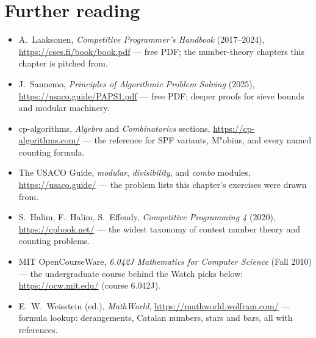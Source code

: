 \chapternotes

\section*{Further reading}
\begin{itemize}
\item A.~Laaksonen, \emph{Competitive Programmer's Handbook}
(2017--2024), \url{https://cses.fi/book/book.pdf} --- free PDF;
the number-theory chapters this chapter is pitched from.
\item J.~Sannemo, \emph{Principles of Algorithmic Problem Solving}
(2025), \url{https://usaco.guide/PAPS1.pdf} --- free PDF; deeper
proofs for sieve bounds and modular machinery.
\item cp-algorithms, \emph{Algebra} and \emph{Combinatorics}
sections, \url{https://cp-algorithms.com/} --- the reference for
SPF variants, M"obius, and every named counting formula.
\item The USACO Guide, \emph{modular}, \emph{divisibility}, and
\emph{combo} modules, \url{https://usaco.guide/} --- the problem
lists this chapter's exercises were drawn from.
\item S.~Halim, F.~Halim, S.~Effendy, \emph{Competitive
Programming 4} (2020), \url{https://cpbook.net/} --- the widest
taxonomy of contest number theory and counting problems.
\item MIT OpenCourseWare, \emph{6.042J Mathematics for Computer
Science} (Fall 2010) --- the undergraduate course behind the
Watch picks below: \url{https://ocw.mit.edu/} (course 6.042J).
\item E.~W.~Weisstein (ed.), \emph{MathWorld},
\url{https://mathworld.wolfram.com/} --- formula lookup:
derangements, Catalan numbers, stars and bars, all with references.
\end{itemize}

